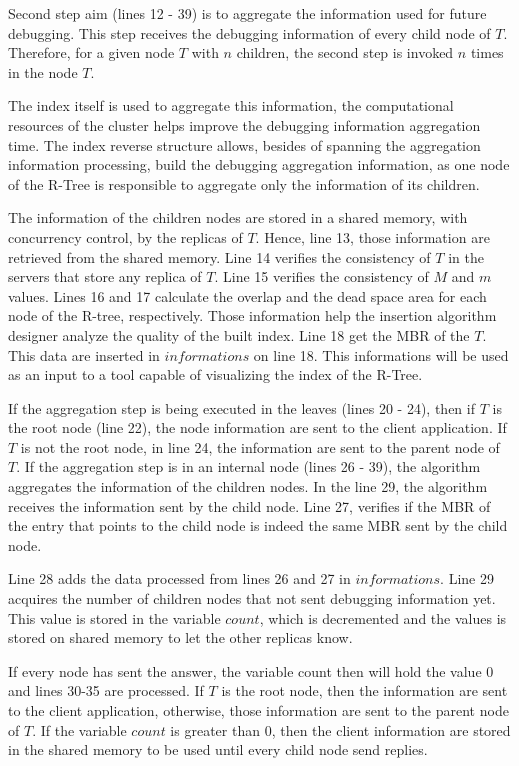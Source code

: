 	Second step aim (lines 12 - 39) is to aggregate the information used for future debugging. This step receives the debugging information of every child node of $T$. Therefore, for a given node $T$ with $n$ children, the second step is invoked $n$ times in the node $T$.

	The index itself is used to aggregate this information, the computational resources of the cluster helps improve the debugging information aggregation time. The index reverse structure allows, besides of spanning the aggregation information processing, build the debugging aggregation information, as one node of the R-Tree is responsible to aggregate only the information of its children. 

	The information of the children nodes are stored in a shared memory, with concurrency control, by the replicas of $T$. Hence, line 13, those information are retrieved from the shared memory. Line 14 verifies the consistency of $T$ in the servers that store any replica of $T$. Line 15 verifies the consistency of $M$ and $m$ values. Lines 16 and 17 calculate the overlap and the dead space area for each node of the R-tree, respectively. Those information help the insertion algorithm designer analyze the quality of the built index. Line 18 get the MBR of the $T$. This data are inserted in $informations$ on line 18. This informations will be used as an input to a tool capable of visualizing the index of the R-Tree.
	
	If the aggregation step is being executed in the leaves (lines 20 - 24), then if  $T$ is the root node (line 22), the node information are sent to the client application. If $T$ is not the root node, in line 24, the information are sent to the parent node of $T$. If the aggregation step is in an internal node (lines 26 - 39), the algorithm aggregates the information of the children nodes. In the line 29, the algorithm receives the information sent by the child node. Line 27, verifies if the MBR of the entry that points to the child node is indeed the same MBR sent by the child node.
	
	Line 28 adds the data processed from lines 26 and 27 in $informations$. Line 29 acquires the number of children nodes that not sent debugging information yet. This value is stored in the variable $count$, which is decremented and the values is stored on shared memory to let the other replicas know.
	
	If every node has sent the answer, the variable count then will hold the value 0 and lines 30-35 are processed. If $T$ is the root node, then the information are sent to the client application, otherwise, those information are sent to the parent node of $T$. If the variable $count$ is greater than 0, then the client information are stored in the shared memory to be used until every child node send replies.	
	
